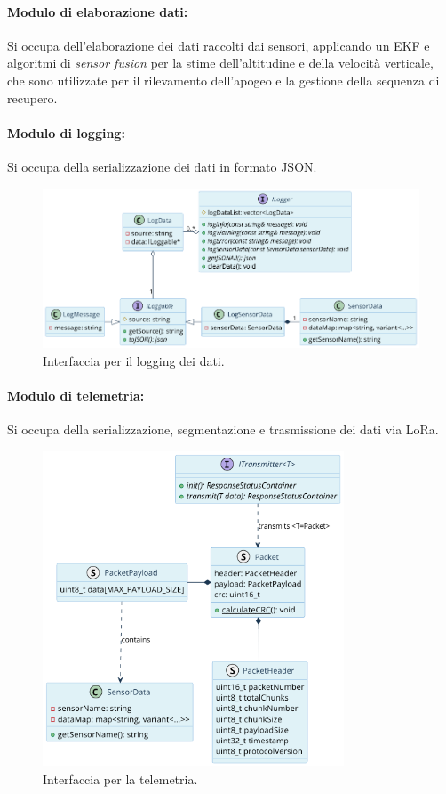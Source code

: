\documentclass[12pt,a4paper,twoside]{book}
\begin{document}
\newpage
\paragraph{\textbf{Modulo di elaborazione dati:}}Si occupa dell'elaborazione dei 
dati raccolti dai sensori, applicando un \ac{EKF} e algoritmi di \emph{sensor 
fusion} per la stime dell'altitudine e della velocità verticale, che sono 
utilizzate per il rilevamento dell'apogeo e la gestione della sequenza di recupero.

\newpage
\paragraph{\textbf{Modulo di logging:}}Si occupa della serializzazione dei dati in formato JSON.
\begin{figure}[H]
    \centering
    \includegraphics[width=1\textwidth]{img/uml/logger.png}
    \caption{Interfaccia per il logging dei dati.}
    \label{fig:flight-computer-logger}
\end{figure}
\newpage
\paragraph{\textbf{Modulo di telemetria:}}Si occupa della serializzazione, segmentazione
e trasmissione dei dati via \ac{LoRa}.
\begin{figure}[H]
    \centering
    \includegraphics[width=0.8\textwidth]{img/uml/transmitter.png}
    \caption{Interfaccia per la telemetria.}
    \label{fig:flight-computer-telemetry}
\end{figure}
\newpage
\end{document}
